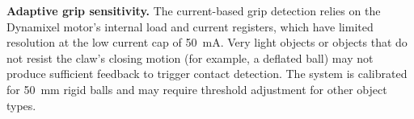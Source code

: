 \textbf{Adaptive grip sensitivity.} The current-based grip
detection relies on the Dynamixel motor's internal load and
current registers, which have limited resolution at the low
current cap of 50~mA. Very light objects or objects that do
not resist the claw's closing motion (for example, a deflated
ball) may not produce sufficient feedback to trigger contact
detection. The system is calibrated for 50~mm rigid balls and
may require threshold adjustment for other object types.
